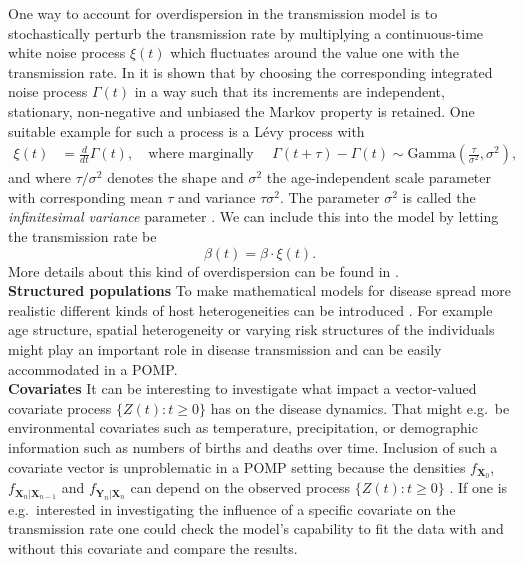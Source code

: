 One way to account for overdispersion in the transmission model is to  stochastically perturb the transmission rate  by
multiplying a continuous-time white noise    process $\xi(t)$ which fluctuates around the value one with the transmission rate.  
In \cite{breto} it is shown that by choosing the corresponding integrated noise process $\Gamma(t)$ in a way  such that its increments are independent, stationary, non-negative  and unbiased the Markov property is retained. 
One suitable example for such a process is  a L\'evy process  with
\begin{align*}
\xi(t)&=\frac{d}{dt}\Gamma(t),\quad \text{where marginally } \quad  \Gamma(t+\tau )-\Gamma(t)\sim \text{Gamma}\left(\frac{\tau}{\sigma^2},\sigma^2\right),
\end{align*}
and where $\tau /\sigma^2$ denotes the shape and $\sigma^2$  the age-independent scale parameter with corresponding mean $\tau$ and variance $\tau\sigma^2$.  
The parameter $\sigma^2$ is called the \textit{infinitesimal variance} parameter \citep{karlin}. We can include this into the model by letting  the  transmission rate  be
\begin{equation}
\beta(t)=\beta\cdot \xi(t). \label{gammawnoise}
\end{equation} 
More details about this kind of overdispersion can be found in \cite{breto,Breto2011}.\\
\newline
\textbf{Structured populations} To make mathematical models for disease spread more realistic different kinds of host heterogeneities can be introduced \citep{kee}. For example age structure, spatial heterogeneity or varying risk structures of the individuals might play an important role in disease transmission and  can be  easily accommodated in a POMP.  \\
\newline
\textbf{Covariates}  It can be interesting  to investigate what impact a vector-valued covariate process $\{Z(t): t \geq 0\}$ has on the disease dynamics. 
 That might  e.g.\ be environmental covariates such as temperature,  precipitation, or demographic information such as numbers of births and deaths over time. Inclusion of such a covariate vector is unproblematic in a POMP setting because the densities $f_{\bm{X}_0}$, 
$f_{\bm{X}_n|\bm{X}_{n-1}}$ and $f_{\bm{Y}_n|\bm{X}_n}$ can depend on the observed process $\{Z(t):t \geq 0\}$ \citep{kingNgu}.  If one is e.g.\ interested in investigating the influence of a specific covariate on the transmission rate one  could check the model's capability to fit the data with and without this covariate and compare the results. 
